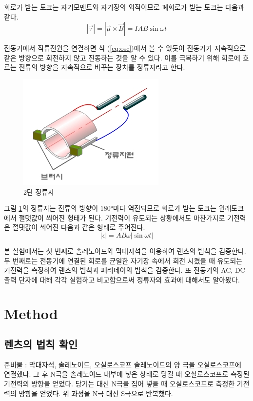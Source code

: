 \documentclass[a4paper]{article}
\begin{document}
	회로가 받는 토크는 자기모멘트와 자기장의 외적이므로 폐회로가 받는 토크는 다음과 같다.
	\begin{equation} \label{eq:osc}
		|\vec{\tau}| = |\vec{\mu} \times \vec{B}| = IAB\sin{\omega{}t}
	\end{equation}

 	전동기에서 직류전원을 연결하면 식 (\ref{eq:osc})에서 볼 수 있듯이 전동기가 지속적으로 같은 방향으로 회전하지 않고 진동하는 것을 알 수 있다.
 	이를 극복하기 위해 회로에 흐르는 전류의 방향을 지속적으로 바꾸는 장치를 정류자라고 한다.
 	\begin{figure}[h]   		
 		\centering
 		\includegraphics[scale=0.5]{img/a-5385.jpg}
 		\caption{2단 정류자}
   		\label{fig:com}
 	\end{figure}

 	그림 \ref{fig:com}의 정류자는 전류의 방향이 $\ang{180;;}$마다 역전되므로 회로가 받는 토크는 원래토크에서 절댓값이 씌어진 형태가 된다.
 	기전력이 유도되는 상황에서도 마찬가지로 기전력은 절댓값이 씌어진 다음과 같은 형태로 주어진다.
 	\begin{equation}
 		|\epsilon| = AB\omega{}|\sin{\omega t}|
 	\end{equation}

 	본 실험에서는 첫 번째로 솔레노이드와 막대자석을 이용하여 렌츠의 법칙을 검증한다.
 	두 번째로는 전동기에 연결된 회로를 균일한 자기장 속에서 회전 시켰을 때 유도되는 기전력을 측정하여 렌츠의 법칙과 페러데이의 법칙을 검증한다.
 	또 전동기의 AC, DC출력 단자에 대해 각각 실험하고 비교함으로써 정류자의 효과에 대해서도 알아봤다.
	\newpage

	\section{Method}
	\subsection{렌츠의 법칙 확인}
	준비물 : 막대자석, 솔레노이드, 오실로스코프
	솔레노이드의 양 극을 오실로스코프에 연결했다. 
	그 후 N극을 솔레노이드 내부에 넣은 상태로 당길 때 오실로스코프로 측정된 기전력의 방향을 얻었다.
	당기는 대신 N극을 집어 넣을 때 오실로스코프로 측정한 기전력의 방향을 얻었다.
	위 과정을 N극 대신 S극으로 반복했다.
\end{document}
